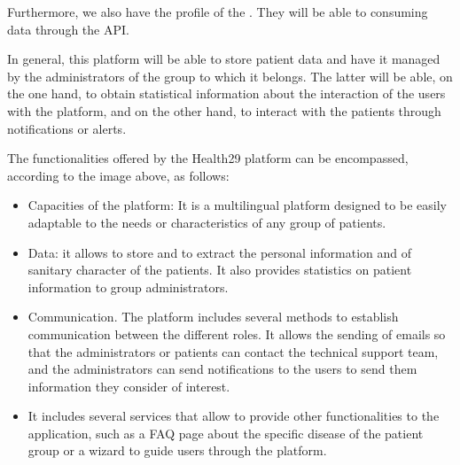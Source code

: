 \documentclass[letterpaper,10pt,english]{sphinxmanual}
\begin{document}
Furthermore, we also have the profile of the . They will be able to consuming data through the API.

In general, this platform will be able to store patient data and have it managed by the administrators of the group to which it belongs. The latter will be able, on the one hand, to obtain statistical information about the interaction of the users with the platform, and on the other hand, to interact with the patients through notifications or alerts.



The functionalities offered by the Health29 platform can be encompassed, according to the image above, as follows:
\begin{itemize}
\item {} 
Capacities of the platform: It is a multilingual platform designed to be easily adaptable to the needs or characteristics of any group of patients.

\item {} 
Data: it allows to store and to extract the personal information and of sanitary character of the patients. It also provides statistics on patient information to group administrators.

\item {} 
Communication. The platform includes several methods to establish communication between the different roles. It allows the sending of emails so that the administrators or patients can contact the technical support team, and the administrators can send notifications to the users to send them information they consider of interest.

\item {} 
It includes several services that allow to provide other functionalities to the application, such as a FAQ page about the specific disease of the patient group or a wizard to guide users through the platform.

\end{itemize}
\end{document}
